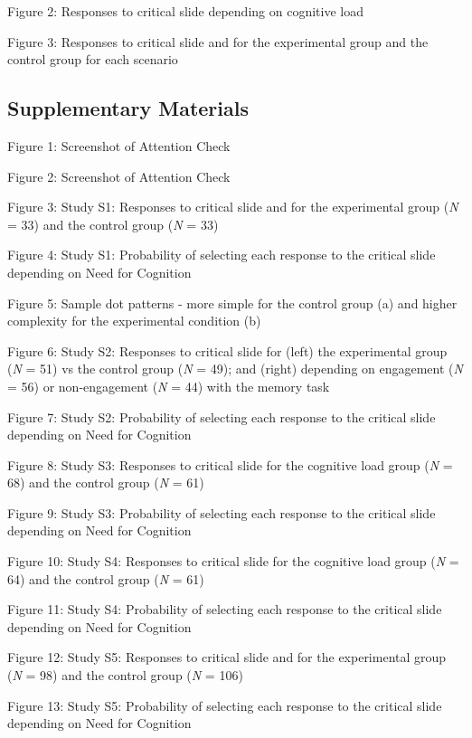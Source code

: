 Figure 2: Responses to critical slide depending on cognitive load

Figure 3: Responses to critical slide and for the experimental group and
the control group for each scenario

\hypertarget{supplementary-materials}{%
\subsection{Supplementary Materials}\label{supplementary-materials}}

Figure 1: Screenshot of Attention Check

Figure 2: Screenshot of Attention Check

Figure 3: Study S1: Responses to critical slide and for the experimental
group (\emph{N} = 33) and the control group (\emph{N} = 33)

Figure 4: Study S1: Probability of selecting each response to the
critical slide depending on Need for Cognition

Figure 5: Sample dot patterns - more simple for the control group (a)
and higher complexity for the experimental condition (b)

Figure 6: Study S2: Responses to critical slide for (left) the
experimental group (\emph{N} = 51) vs the control group (\emph{N} = 49);
and (right) depending on engagement (\emph{N} = 56) or non-engagement
(\emph{N} = 44) with the memory task

Figure 7: Study S2: Probability of selecting each response to the
critical slide depending on Need for Cognition

Figure 8: Study S3: Responses to critical slide for the cognitive load
group (\emph{N} = 68) and the control group (\emph{N} = 61)

Figure 9: Study S3: Probability of selecting each response to the
critical slide depending on Need for Cognition

Figure 10: Study S4: Responses to critical slide for the cognitive load
group (\emph{N} = 64) and the control group (\emph{N} = 61)

Figure 11: Study S4: Probability of selecting each response to the
critical slide depending on Need for Cognition

Figure 12: Study S5: Responses to critical slide and for the
experimental group (\emph{N} = 98) and the control group (\emph{N} =
106)

Figure 13: Study S5: Probability of selecting each response to the
critical slide depending on Need for Cognition
